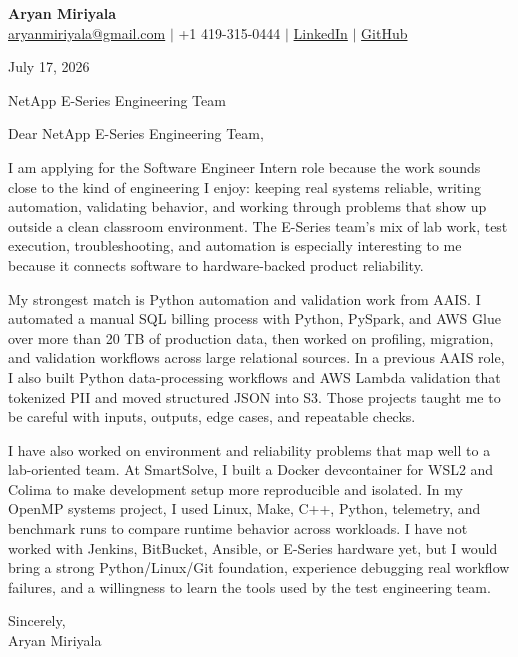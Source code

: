 \documentclass[letterpaper,11pt]{article}
\begin{document}
{\Large\textbf{Aryan Miriyala}}\\
\href{mailto:aryanmiriyala@gmail.com}{aryanmiriyala@gmail.com} $|$ +1 419-315-0444 $|$
\href{https://www.linkedin.com/in/aryan-miriyala-7788a21b6/}{LinkedIn} $|$
\href{https://github.com/aryanmiriyala}{GitHub}

July 17, 2026

NetApp E-Series Engineering Team

Dear NetApp E-Series Engineering Team,

I am applying for the Software Engineer Intern role because the work sounds close to the kind of engineering I enjoy: keeping real systems reliable, writing automation, validating behavior, and working through problems that show up outside a clean classroom environment. The E-Series team's mix of lab work, test execution, troubleshooting, and automation is especially interesting to me because it connects software to hardware-backed product reliability.

My strongest match is Python automation and validation work from AAIS. I automated a manual SQL billing process with Python, PySpark, and AWS Glue over more than 20 TB of production data, then worked on profiling, migration, and validation workflows across large relational sources. In a previous AAIS role, I also built Python data-processing workflows and AWS Lambda validation that tokenized PII and moved structured JSON into S3. Those projects taught me to be careful with inputs, outputs, edge cases, and repeatable checks.

I have also worked on environment and reliability problems that map well to a lab-oriented team. At SmartSolve, I built a Docker devcontainer for WSL2 and Colima to make development setup more reproducible and isolated. In my OpenMP systems project, I used Linux, Make, C++, Python, telemetry, and benchmark runs to compare runtime behavior across workloads. I have not worked with Jenkins, BitBucket, Ansible, or E-Series hardware yet, but I would bring a strong Python/Linux/Git foundation, experience debugging real workflow failures, and a willingness to learn the tools used by the test engineering team.

Sincerely,\\
Aryan Miriyala
\end{document}
